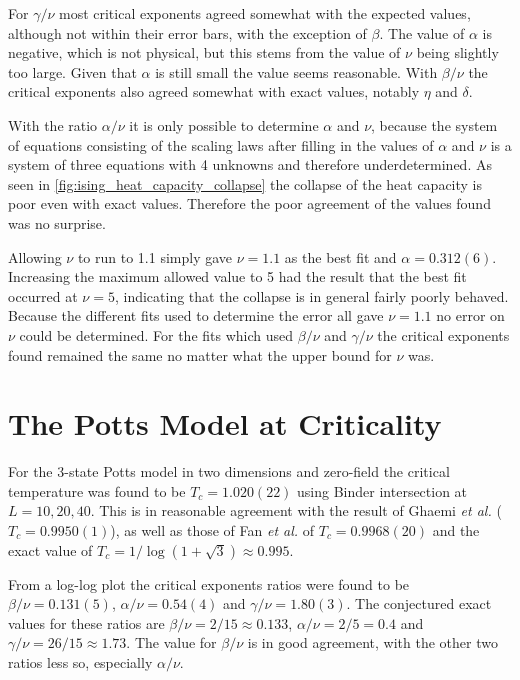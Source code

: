 \documentclass[11pt, a4paper]{report} %
\begin{document}
For \(\gamma/\nu\) most critical exponents agreed somewhat with the expected values, although not within their error bars, with the exception of \(\beta\).
The value of \(\alpha\) is negative, which is not physical, but this stems from the value of \(\nu\) being slightly too large.
Given that \(\alpha\) is still small the value seems reasonable.
With \(\beta/\nu\) the critical exponents also agreed somewhat with exact values, notably \(\eta\) and \(\delta\).

With the ratio \(\alpha / \nu\) it is only possible to determine \(\alpha\) and \(\nu\), because the system of equations consisting of the scaling laws after filling in the values of \(\alpha\) and \(\nu\) is a system of three equations with 4 unknowns and therefore underdetermined.
As seen in \cref{fig:ising_heat_capacity_collapse} the collapse of the heat capacity is poor even with exact values.
Therefore the poor agreement of the values found was no surprise.

Allowing \(\nu\) to run to 1.1 simply gave \(\nu = 1.1\) as the best fit and \(\alpha = 0.312(6)\).
Increasing the maximum allowed value to 5 had the result that the best fit occurred at \(\nu=5\),
indicating that the collapse is in general fairly poorly behaved.
Because the different fits used to determine the error all gave \(\nu=1.1\) no error on \(\nu\) could be determined.
For the fits which used \(\beta/\nu\) and \(\gamma/\nu\) the critical exponents found remained the same no matter what the upper bound for \(\nu\) was.



\section{The Potts Model at Criticality}

For the 3-state Potts model in two dimensions and zero-field the critical temperature was found to be \(T_c=1.020(22)\) using Binder intersection at \(L = 10, 20, 40\).
This is in reasonable agreement with the result of Ghaemi \textit{et al.}\cite{ghaemi:2001} (\(T_c=0.9950(1)\)), as well as those of Fan \textit{et al.}\cite{fan:2007} of \(T_c = 0.9968(20)\) and the exact value of \(T_c = 1/\log(1+\sqrt{3}) \approx 0.995\).

From a log-log plot the critical exponents ratios were found to be \(\beta/\nu = 0.131(5)\), \(\alpha/\nu = 0.54(4)\) and \(\gamma/\nu = 1.80(3)\).
The conjectured exact values for these ratios are \(\beta/\nu = 2/15 \approx 0.133\), \(\alpha/\nu = 2/5 =0.4\) and \(\gamma/\nu = 26/15 \approx 1.73\).
The value for \(\beta/\nu\) is in good agreement, with the other two ratios less so, especially \(\alpha/\nu\).
\end{document}
